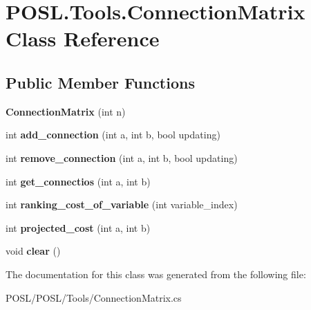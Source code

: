 \hypertarget{classPOSL_1_1Tools_1_1ConnectionMatrix}{}\section{P\+O\+S\+L.\+Tools.\+Connection\+Matrix Class Reference}
\label{classPOSL_1_1Tools_1_1ConnectionMatrix}
\subsection*{Public Member Functions}
\begin{DoxyCompactItemize}
\item 
\mbox{\label{classPOSL_1_1Tools_1_1ConnectionMatrix_a0eca15eb6b4a326ba28fca14ef23d9cd}} 
{\bfseries Connection\+Matrix} (int n)
\item 
\mbox{\label{classPOSL_1_1Tools_1_1ConnectionMatrix_a70b7d98c6c3adc0a9ef316109e0e3694}} 
int {\bfseries add\+\_\+connection} (int a, int b, bool updating)
\item 
\mbox{\label{classPOSL_1_1Tools_1_1ConnectionMatrix_a3538acc9b3491f308c68a8eb92e23152}} 
int {\bfseries remove\+\_\+connection} (int a, int b, bool updating)
\item 
\mbox{\label{classPOSL_1_1Tools_1_1ConnectionMatrix_a224493020bd1c4e5b6281ded7f3222c5}} 
int {\bfseries get\+\_\+connectios} (int a, int b)
\item 
\mbox{\label{classPOSL_1_1Tools_1_1ConnectionMatrix_ac6063f7933c40c5b33b35ffb6b14816b}} 
int {\bfseries ranking\+\_\+cost\+\_\+of\+\_\+variable} (int variable\+\_\+index)
\item 
\mbox{\label{classPOSL_1_1Tools_1_1ConnectionMatrix_a85cd79597c9d79e11f27524a7aebdc79}} 
int {\bfseries projected\+\_\+cost} (int a, int b)
\item 
\mbox{\label{classPOSL_1_1Tools_1_1ConnectionMatrix_a45aa862703300f0837bdb535282ff237}} 
void {\bfseries clear} ()
\end{DoxyCompactItemize}


The documentation for this class was generated from the following file\+:\begin{DoxyCompactItemize}
\item 
P\+O\+S\+L/\+P\+O\+S\+L/\+Tools/Connection\+Matrix.\+cs\end{DoxyCompactItemize}
